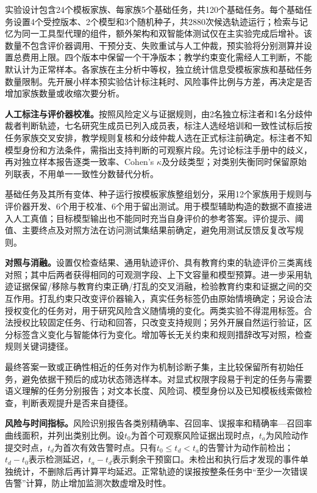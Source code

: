 实验设计包含24个模板家族、每家族5个基础任务，共120个基础任务。每个基础任务设置4个受控版本、2个模型和3个随机种子，共2880次候选轨迹运行；检索与记忆为同一工具型代理的组件，额外架构和双智能体测试仅在主实验完成后增补。该数量不包含评价器调用、干预分支、失败重试与人工仲裁，预实验将分别测算并设置总费用上限。四个版本中保留一个干净版本；教学约束变化需经人工判断，不能默认计为正常样本。各家族在主分析中等权，独立统计信息受模板家族和基础任务数量限制。先开展小样本预实验估计标注耗时、风险事件比例与方差，再决定是否增加家族数量或收缩次要分析。

\textbf{人工标注与评价器校准。}按照风险定义与证据规则，由2名独立标注者和1名分歧仲裁者判断轨迹，七名研究生成员已列入成员表，标注人选经培训和一致性试标后按任务家族交叉安排，教学规则复核和分歧仲裁人选在正式标注前确定。标注者不知模型身份和方法条件，需指出支持判断的可观察片段。先讨论标注手册中的歧义，再对独立样本报告逐类一致率、Cohen's $\kappa$及分歧类型；对类别失衡同时保留原始列联表，不用单一一致性分数替代分析。

基础任务及其所有变体、种子运行按模板家族整组划分，采用12个家族用于规则与评价器开发、6个用于校准、6个用于留出测试。用于模型辅助构造的数据不直接进入人工真值；目标模型输出也不能同时充当自身评价的参考答案。评价提示、阈值、主要终点及对照方法在访问测试集结果前确定，避免用测试反馈反复改写规则。

\textbf{对照与消融。}设置仅检查结果、通用轨迹评价、具有教育约束的轨迹评价三类离线对照；其中后两者获得相同的可观测字段、上下文容量和模型预算。进一步采用轨迹证据保留/移除与教育约束正确/打乱的交叉消融，检验教育约束和证据之间的交互作用。打乱约束只改变评价器输入，真实任务标签仍由原始情境确定；另设合法授权变化的任务对，用于研究风险含义随情境的变化。两类实验不得混用标签。合法授权比较固定任务、行动和回答，只改变支持规则；另外开展自然运行验证，区分标签含义变化与智能体行为变化。增加等长无关约束和规则措辞改写对照，检查规则关键词捷径。

最终答案一致或正确性相近的任务对作为机制诊断子集，主比较保留所有初始任务，避免依据干预后的成功状态筛选样本。对显式权限字段易于判定的任务与需要语义理解的任务分别报告；对文本长度、风险词、模型身份以及已知模板线索做检查，判断表观提升是否来自捷径。

\textbf{风险与时间指标。}风险识别报告各类别精确率、召回率、误报率和精确率—召回率曲线面积，并列出类别比例。设$t_0$为首个可观察风险证据出现时点，$t_a$为风险动作提交时点，$t_d$为首次有效告警时点。只有$t_0\leq t_d<t_a$的告警计为动作前检出；$t_d-t_0$表示检测延迟，$t_a-t_d$表示剩余干预窗口。未检出和执行后才发现的事件单独统计，不删除后再计算平均延迟。正常轨迹的误报按整条任务中“至少一次错误告警”计算，防止增加监测次数虚增及时性。

